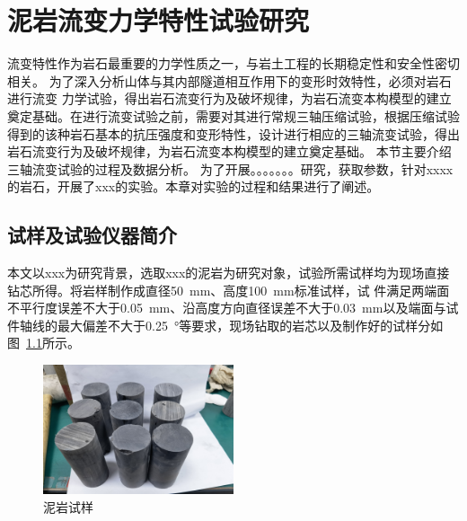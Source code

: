 \chapter{泥岩流变力学特性试验研究}
\label{chap:theory}
流变特性作为岩石最重要的力学性质之一，与岩土工程的长期稳定性和安全性密切相关。
为了深入分析山体与其内部隧道相互作用下的变形时效特性，必须对岩石进行流变
力学试验，得出岩石流变行为及破坏规律，为岩石流变本构模型的建立奠定基础。在进行流变试验之前，需要对其进行常规三轴压缩试验，根据压缩试验得到的该种岩石基本的抗压强度和变形特性，设计进行相应的三轴流变试验，得出岩石流变行为及破坏规律，为岩石流变本构模型的建立奠定基础。
本节主要介绍三轴流变试验的过程及数据分析。
为了开展。。。。。。。研究，获取参数，针对xxxx的岩石，开展了xxx的实验。本章对实验的过程和结果进行了阐述。


%

\section{试样及试验仪器简介}
本文以xxx为研究背景，选取xxx的泥岩为研究对象，试验所需试样均为现场直接钻芯所得。将岩样制作成直径\SI{50}{mm}、高度\SI{100}{mm}标准试样，试
件满足两端面不平行度误差不大于\SI{0.05}{mm}、沿高度方向直径误差不大于\SI{0.03}{mm}以及端面与试件轴线的最大偏差不大于\SI{0.25}{\degree}等要求，现场钻取的岩芯以及制作好的试样分如图~\ref{fig:2-1}所示。

\begin{figure}[ht!]
    \centering
    \includegraphics[width=0.5\textwidth]{img/chap2/试样制备.jpg}
    \caption{泥岩试样}
    \label{fig:2-1}
\end{figure}

